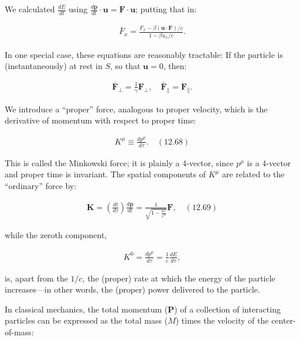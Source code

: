 \documentclass[11pt,letterpaper]{book}
\newcommand{\bm}[1]{\boldsymbol{#1}}
\begin{document}
        We calculated \(\frac{dE}{dt}\) using \(\frac{d\bm{p}}{dt} \cdot \bm{u} = \bm{F} \cdot \bm{u}\); putting that in:
        
        \begin{align}
        \bar{F}_x = \frac{F_x - \beta (\bm{u} \cdot \bm{F})/c}{1 - \beta u_x/c}.
        \end{align}
        
        In one special case, these equations are reasonably tractable: If the particle is (instantaneously) at rest in \(S\), so that \(\bm{u} = 0\), then:
        
        \begin{align}
        \bar{\bm{F}}_\perp = \frac{1}{\gamma} \bm{F}_\perp, \quad \bar{\bm{F}}_\parallel = \bm{F}_\parallel.
        \end{align}
        
        We introduce a “proper” force, analogous to proper velocity, which is the derivative of momentum with respect to proper time:
        
        \begin{align}
        K^\mu \equiv \frac{dp^\mu}{d\tau}. \quad (12.68)
        \end{align}
        
        This is called the Minkowski force; it is plainly a 4-vector, since \(p^\mu\) is a 4-vector and proper time is invariant. The spatial components of \(K^\mu\) are related to the “ordinary” force by:
        
        \begin{align}
        \bm{K} = \left(\frac{dt}{d\tau}\right) \frac{d\bm{p}}{dt} = \frac{1}{\sqrt{1 - \frac{u^2}{c^2}}} \bm{F}, \quad (12.69)
        \end{align}
        
        while the zeroth component,
        
        \begin{align}
        K^0 = \frac{dp^0}{d\tau} = \frac{1}{c} \frac{dE}{d\tau},
        \end{align}
        
        is, apart from the \(1/c\), the (proper) rate at which the energy of the particle increases—in other words, the (proper) power delivered to the particle.

        In classical mechanics, the total momentum (\(\bm{P}\)) of a collection of interacting particles can be expressed as the total mass (\(M\)) times the velocity of the center-of-mass:
        
\end{document}
